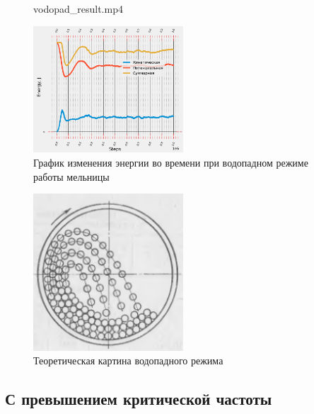 \documentclass[c]{beamer}  %
\begin{document}
\begin{frame}
\frametitle{\insertsection} 
\framesubtitle{\insertsubsection}

\begin{figure}[ht]
     		{vodopad_result.mp4}
\end{figure}
 {
\begin{figure}[H]
	\centering
	\includegraphics[width=0.5\textwidth]{vodopad_energy} 
	\caption{График изменения энергии во времени при водопадном режиме работы мельницы}
	\label{pic:vodopad_energy}
\end{figure} 
}
{
\begin{figure}[H]
	\centering
	\includegraphics[width=0.5\textwidth]{vodopad_theory} 
	\caption{Теоретическая картина водопадного режима}
\end{figure}
}

\end{frame}









\subsection{С превышением критической частоты}
\end{document}
